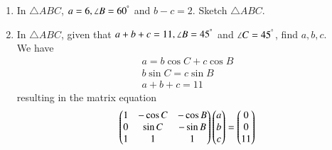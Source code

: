 \documentclass[journal,12pt,twocolumn]{IEEEtran}
\renewcommand\thesection{\arabic{section}}
\begin{document}
\begin{enumerate}[label=\thesection.\arabic*
,ref=\thesection.\theenumi]
\item In $\triangle ABC$,  $a = 6, \angle B = 60^{\degree}$ and $b-c = 2$. 
Sketch $\triangle ABC$.
%
\item In $\triangle ABC$,  given that $a+b+c = 11, \angle B = 45^{\degree}$ and $\angle C = 45^{\degree}$, 
find 
$a,b,c$.
\\
\solution We have
\begin{align}
a = b \cos C + c \cos B
\\
b \sin C = c \sin B
\\
a + b+c = 11
\end{align}
%
resulting  in the matrix equation 
\begin{align}
\begin{pmatrix}
1 & -\cos C & - \cos B
\\
0 & \sin C &- \sin B
\\
1 & 1 & 1
\end{pmatrix}
\begin{pmatrix}a \\b\\c\end{pmatrix} = \begin{pmatrix}0 \\ 0 \\ 11\end{pmatrix}
\end{align}


\end{enumerate}
\end{document}
